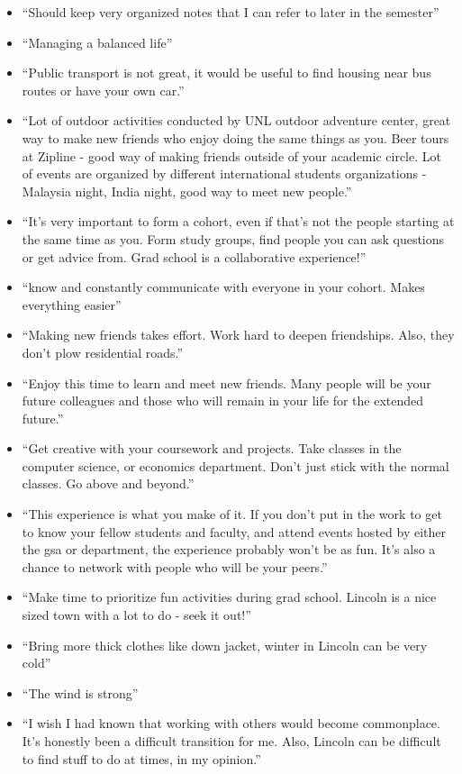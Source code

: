 \documentclass[
  12pt,
]{book}
\providecommand{\tightlist}{%
  \setlength{\itemsep}{0pt}\setlength{\parskip}{0pt}}
\begin{document}
\begin{itemize}
\tightlist
\item
  ``Should keep very organized notes that I can refer to later in the semester''
\item
  ``Managing a balanced life''
\item
  ``Public transport is not great, it would be useful to find housing near bus routes or have your own car.''
\item
  ``Lot of outdoor activities conducted by UNL outdoor adventure center, great way to make new friends who enjoy doing the same things as you. Beer tours at Zipline - good way of making friends outside of your academic circle. Lot of events are organized by different international students organizations - Malaysia night, India night, good way to meet new people.''
\item
  ``It's very important to form a cohort, even if that's not the people starting at the same time as you. Form study groups, find people you can ask questions or get advice from. Grad school is a collaborative experience!''
\item
  ``know and constantly communicate with everyone in your cohort. Makes everything easier''
\item
  ``Making new friends takes effort. Work hard to deepen friendships. Also, they don't plow residential roads.''
\item
  ``Enjoy this time to learn and meet new friends. Many people will be your future colleagues and those who will remain in your life for the extended future.''
\item
  ``Get creative with your coursework and projects. Take classes in the computer science, or economics department. Don't just stick with the normal classes. Go above and beyond.''
\item
  ``This experience is what you make of it. If you don't put in the work to get to know your fellow students and faculty, and attend events hosted by either the gsa or department, the experience probably won't be as fun. It's also a chance to network with people who will be your peers.''
\item
  ``Make time to prioritize fun activities during grad school. Lincoln is a nice sized town with a lot to do - seek it out!''
\item
  ``Bring more thick clothes like down jacket, winter in Lincoln can be very cold''
\item
  ``The wind is strong''
\item
  ``I wish I had known that working with others would become commonplace. It's honestly been a difficult transition for me. Also, Lincoln can be difficult to find stuff to do at times, in my opinion.''

\end{itemize}
\end{document}
